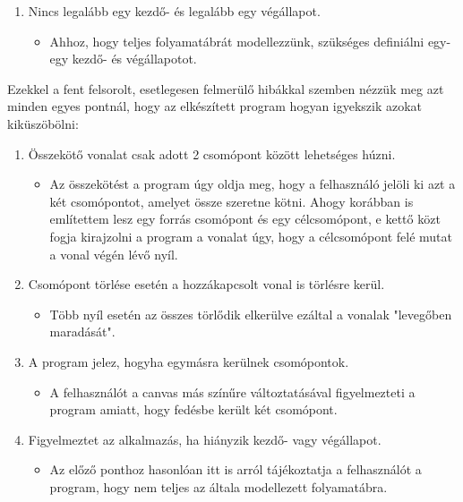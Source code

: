 \begin{enumerate}
\item Nincs legalább egy kezdő- és legalább egy végállapot.

\begin{itemize}
\item Ahhoz, hogy teljes folyamatábrát modellezzünk, szükséges definiálni egy-egy kezdő- és végállapotot.
\end{itemize}

\end{enumerate}

Ezekkel a fent felsorolt, esetlegesen felmerülő hibákkal szemben nézzük meg azt minden egyes pontnál, hogy az elkészített program hogyan igyekszik azokat kiküszöbölni:

\begin{enumerate}
\item Összekötő vonalat csak adott 2 csomópont között lehetséges húzni.

\begin{itemize}
\item Az összekötést a program úgy oldja meg, hogy a felhasználó jelöli ki azt a két csomópontot, amelyet össze szeretne kötni. Ahogy korábban is említettem lesz egy forrás csomópont és egy célcsomópont, e kettő közt fogja kirajzolni a program a vonalat úgy, hogy a célcsomópont felé mutat a vonal végén lévő nyíl.
\end{itemize}

\item Csomópont törlése esetén a hozzákapcsolt vonal is törlésre kerül.

\begin{itemize}
\item Több nyíl esetén az összes törlődik elkerülve ezáltal a vonalak "levegőben maradását".
\end{itemize}

\item A program jelez, hogyha egymásra kerülnek csomópontok.

\begin{itemize}
\item A felhasználót a canvas más színűre változtatásával figyelmezteti a program amiatt, hogy fedésbe került két csomópont.
\end{itemize}

\item Figyelmeztet az alkalmazás, ha hiányzik kezdő- vagy végállapot.

\begin{itemize}
\item Az előző ponthoz hasonlóan itt is arról tájékoztatja a felhasználót a program, hogy nem teljes az általa modellezett folyamatábra.
\end{itemize}

\end{enumerate}

